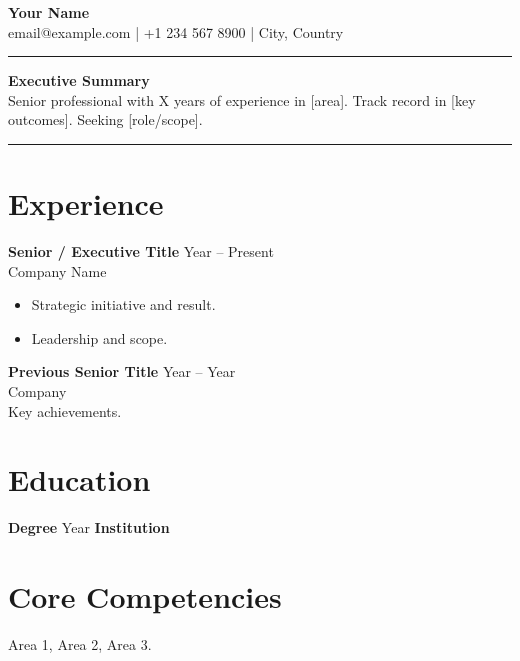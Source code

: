 \documentclass[11pt,a4paper]{article}
\begin{document}
\begin{center}
{\LARGE \textbf{Your Name}}\\[0.2em]
email@example.com \quad | \quad +1 234 567 8900 \quad | \quad City, Country
\end{center}
\begin{flushright}\rule{2cm}{2.5cm}\end{flushright}
\vspace{0.4em}
\noindent\textbf{Executive Summary}\\
Senior professional with X years of experience in [area]. Track record in [key outcomes]. Seeking [role/scope].

\vspace{0.5em}
\noindent\rule{\textwidth}{0.4pt}

\section*{Experience}
\textbf{Senior / Executive Title} \hfill Year -- Present \\
Company Name \\
\begin{itemize}
  \item Strategic initiative and result.
  \item Leadership and scope.
\end{itemize}

\textbf{Previous Senior Title} \hfill Year -- Year \\
Company \\
Key achievements.

\section*{Education}
\textbf{Degree} \hfill Year \quad \textbf{Institution}

\section*{Core Competencies}
Area 1, Area 2, Area 3.
\end{document}
